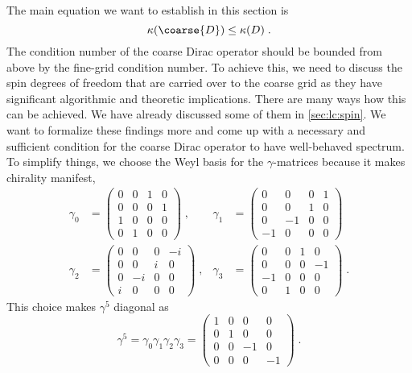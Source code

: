 The main equation we want to establish in this section is
\begin{equation}
\kappa(\coarse{D}) \leq \kappa(D) \;.
\end{equation}
The condition number of the coarse Dirac operator should be bounded from above by the fine-grid condition number.
To achieve this, we need to discuss the spin degrees of freedom that are carried over to the coarse grid as they have significant algorithmic and theoretic implications.
There are many ways how this can be achieved.
We have already discussed some of them in \cref{sec:lc:spin}.
We want to formalize these findings more and come up with a necessary and sufficient condition for the coarse Dirac operator to have well-behaved spectrum.
To simplify things, we choose the Weyl basis for the $\gamma$-matrices because it makes chirality manifest,
\begin{align} \label{eq:gamma:weyl:basis}
\gamma_0 &=
\begin{pmatrix}
0 & 0 & 1 & 0 \\
0 & 0 & 0 & 1 \\
1 & 0 & 0 & 0 \\
0 & 1 & 0 & 0
\end{pmatrix} \;,
&
\gamma_1 &=
\begin{pmatrix}
0 & 0 & 0 & 1 \\
0 & 0 & 1 & 0 \\
0 & -1 & 0 & 0 \\
-1 & 0 & 0 & 0
\end{pmatrix} \\
\gamma_2 &=
\begin{pmatrix}
0 & 0 & 0 & -i \\
0 & 0 & i & 0 \\
0 & -i & 0 & 0 \\
i & 0 & 0 & 0
\end{pmatrix} \;,
&
\gamma_3 &=
\begin{pmatrix}
0 & 0 & 1 & 0 \\
0 & 0 & 0 & -1 \\
-1 & 0 & 0 & 0 \\
0 & 1 & 0 & 0
\end{pmatrix} \;.
\end{align}
This choice makes $\gamma^5$ diagonal as
\begin{equation}
\gamma^5 =
\gamma_0 \gamma_1 \gamma_2 \gamma_3 =
\begin{pmatrix}
1 & 0 & 0 & 0 \\
0 & 1 & 0 & 0 \\
0 & 0 & -1 & 0 \\
0 & 0 & 0 & -1
\end{pmatrix} \;.
\end{equation}
